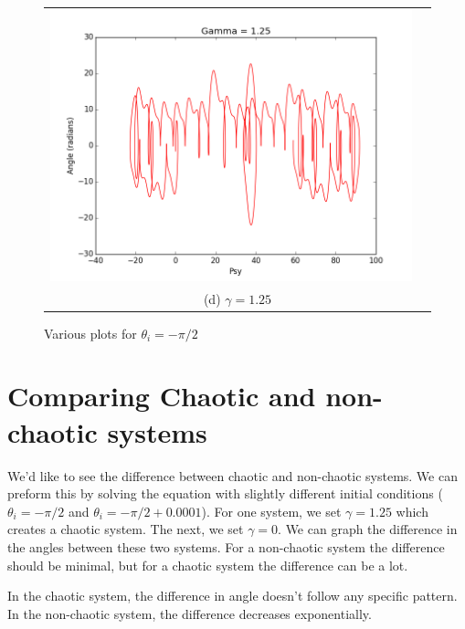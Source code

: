 \documentclass[11pt]{article}
\begin{document}
\begin{figure}[ht]
\begin{tabular}{cc}
\includegraphics[scale=.3]{g25psy.png}\\
\multicolumn{2}{c}{(d) $\gamma = 1.25 $} \\[6pt]
\end{tabular}
\caption{Various plots for $\theta_i = - \pi /2 $}

\end{figure}

\section{Comparing Chaotic and non-chaotic systems}

We'd like to see the difference between chaotic and non-chaotic systems. We can preform this by solving the equation with slightly different initial conditions ($\theta_i = - \pi /2 $ and $\theta_i = - \pi /2 +0.0001 $). For one system, we set $\gamma = 1.25$ which creates a chaotic system. The next, we set $\gamma = 0$. We can graph the difference in the angles between these two systems. For a non-chaotic system the difference should be minimal, but for a chaotic system the difference can be a lot. 

In the chaotic system, the difference in angle doesn't follow any specific pattern. In the non-chaotic system, the difference decreases exponentially.  
\end{document}
